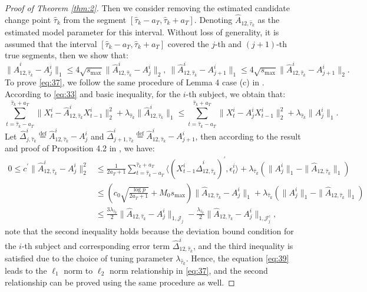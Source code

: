 \documentclass[11pt]{article}
\begin{document}
\begin{proof}[Proof of Theorem \ref{thm:2}]
Then we consider removing the estimated candidate change point $\widehat{\tau}_k$ from the segment $[\widehat{\tau}_k - a_T, \widehat{\tau}_k+a_T]$. Denoting $\widehat{A}_{12,\widehat{\tau}_k}$ as the estimated model parameter for this interval. Without loss of generality, it is assumed that the interval $[\widehat{\tau}_k-a_T, \widehat{\tau}_k+a_T]$ covered the $j$-th and $(j+1)$-th true segments, then we show that:
\begin{equation}
    \label{eq:37}
    \|\widehat{A}_{12,\widehat{\tau}_k}^i - A_j^i\|_1 \leq 4\sqrt{s_{\max}}\|\widehat{A}_{12,\widehat{\tau}_k}^i - A_j^i\|_2, \  \|\widehat{A}_{12,\widehat{\tau}_k}^i - A_{j+1}^i\|_1 \leq 4\sqrt{s_{\max}}\|\widehat{A}_{12,\widehat{\tau}_k}^i - A_{j+1}^i\|_2.
\end{equation}
To prove \eqref{eq:37}, we follow the same procedure of Lemma 4 case (c) in \cite{safikhani2020joint}. According to \eqref{eq:33} and basic inequality, for the $i$-th subject, we obtain that:
\begin{equation}
    \label{eq:38}
    \sum_{t=\widehat{\tau}_k-a_T}^{\widehat{\tau}_k+a_T}\|X_t^i - \widehat{A}^i_{12,\widehat{\tau}_k}X_{t-1}^i\|_2^2 + \lambda_{\widehat{\tau}_k}\|\widehat{A}_{12,\widehat{\tau}_k}^i\|_1 \leq \sum_{t=\widehat{\tau}_k-a_T}^{\widehat{\tau}_k+a_T}\|X_t^i - A^i_jX_{t-1}^i\|_2^2 + \lambda_{\widehat{\tau}_k}\|A_j^i\|_1.
\end{equation}
Let $\widehat{\Delta}^i_{j,\widehat{\tau}_k} \overset{\text{def}}{=} \widehat{A}^i_{12,\widehat{\tau}_k} - A_j^i$ and $\widehat{\Delta}^i_{j+1,\widehat{\tau}_k} \overset{\text{def}}{=} \widehat{A}^i_{12,\widehat{\tau}_k} - A_{j+1}^i$, then according to the result and proof of Proposition 4.2 in \cite{basu2015regularized}, we have:
\begin{align}
    \label{eq:39}
    0 \leq c^\prime\|\widehat{A}^i_{12,\widehat{\tau}_k} - A_j^i\|_2^2 
    &\leq \frac{1}{2a_T+1}\sum_{t=\widehat{\tau}_k-a_T}^{\widehat{\tau}_k+a_T}\langle (X_{t-1}^i\widehat{\Delta}_{12,\widehat{\tau}_k}^i)^\prime, \epsilon_t^i \rangle + \lambda_{\widehat{\tau}_k}\left(\|A_j^i\|_1 - \|\widehat{A}_{12,\widehat{\tau}_k}\|_1\right) \nonumber \\
    &\leq \left(c_0\sqrt{\frac{\log p}{2a_T+1}} + M_0s_{\max}\right)\|\widehat{A}_{12,\widehat{\tau}_k} - A_j^i\|_1 + \lambda_{\widehat{\tau}_k}\left(\|A_j^i\|_1 - \|\widehat{A}_{12,\widehat{\tau}_k}\|_1\right) \nonumber \\
    &\leq \frac{3\lambda_{\widehat{\tau}_k}}{2}\|\widehat{A}_{12,\widehat{\tau}_k} - A_j^i\|_{1,\mathcal{J}_j} - \frac{\lambda_{\widehat{\tau}_k}}{2}\|\widehat{A}_{12,\widehat{\tau}_k} - A_j^i\|_{1,\mathcal{J}_j^c},
\end{align}
note that the second inequality holds because the deviation bound condition for the $i$-th subject and corresponding error term $\widehat{\Delta}^i_{12,\widehat{\tau}_k}$, and the third inequality is satisfied due to the choice of tuning parameter $\lambda_{\widehat{\tau}_k}$. Hence, the equation \eqref{eq:39} leads to the $\ell_1$ norm to $\ell_2$ norm relationship in \eqref{eq:37}, and the second relationship can be proved using the same procedure as well. 


\end{proof}
\end{document}
